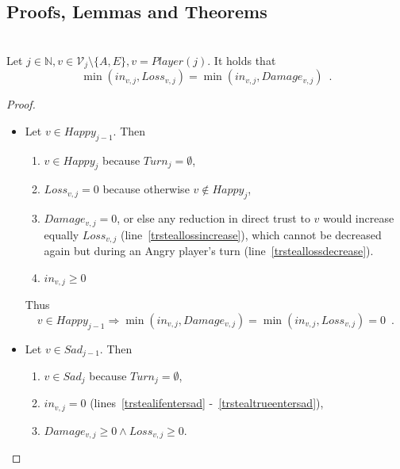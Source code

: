 \documentclass[11pt]{llncs}
\theoremstyle{definition}
\begin{document}
    \subsection{Proofs, Lemmas and Theorems}
    \begin{lemma} \ \\
       Let $j \in \mathbb{N}, v \in \mathcal{V}_j \setminus \{A, E\}, v = Player\left(j\right)$. It holds that
       \begin{equation*}
          \min\left(in_{v, j}, Loss_{v, j}\right) = \min\left(in_{v, j}, Damage_{v, j}\right) \enspace.
       \end{equation*}
    \end{lemma}
    \begin{proof} \ \\
       \begin{itemize}
          \item Let $v \in Happy_{j-1}$. Then
          \begin{enumerate}
             \item $v \in Happy_j$ because $Turn_{j} = \emptyset$,
             \item $Loss_{v, j} = 0$ because otherwise $v \notin Happy_j$,
             \item $Damage_{v, j} = 0$, or else any reduction in direct trust to $v$ would increase equally
             $Loss_{v, j}$ (line~\ref{trsteallossincrease}), which cannot be decreased again but during an Angry player's turn
             (line~\ref{trsteallossdecrease}).
             \item $in_{v, j} \geq 0$
          \end{enumerate}
          Thus
          \begin{equation*}
             v \in Happy_{j-1} \Rightarrow \min\left(in_{v, j}, Damage_{v,j}\right) = \min\left(in_{v, j}, Loss_{v,j}\right)
             = 0 \enspace.
          \end{equation*}
          \item Let $v \in Sad_{j-1}$. Then
          \begin{enumerate}
             \item $v \in Sad_j$ because $Turn_{j} = \emptyset$, 
             \item $in_{v, j} = 0$ (lines~\ref{trstealifentersad} -~\ref{trstealtrueentersad}),
             \item $Damage_{v, j} \geq 0 \wedge Loss_{v, j} \geq 0$.
          \end{enumerate}

\end{itemize}
\end{proof}
\end{document}
